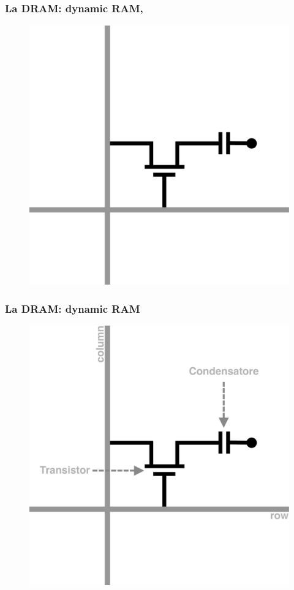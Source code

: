 \begin{frame}
	\frametitle{La DRAM: dynamic RAM, }
	 
	\begin{figure}[!htbp] 
		\centering
		\includegraphics[width=0.6\linewidth]{images/5_memory/dram_bit.pdf}
	\end{figure}
	
\end{frame}


\begin{frame}
	\frametitle{La DRAM: dynamic RAM}
	 
	\begin{figure}[!htbp] 
		\centering
		\includegraphics[width=0.6\linewidth]{images/5_memory/dram_bit_details.pdf}
	\end{figure}
	
\end{frame}


